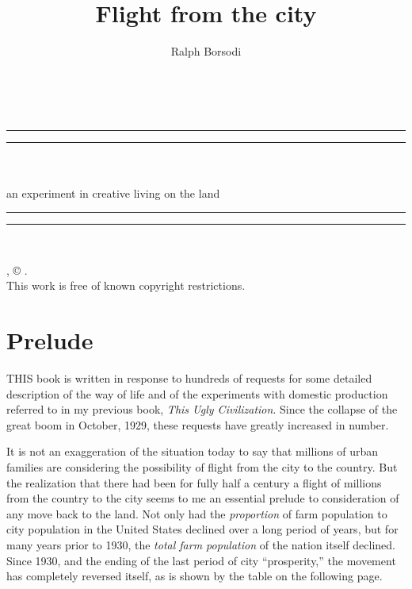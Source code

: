 \documentclass{book}
\date{}
\title{Flight from the city}
\author{Ralph Borsodi}
\begin{document}
\thispagestyle{empty}
\begin{center}
	{\Huge \@title   \\[5mm]}
\end{center}
\newpage
\thispagestyle{empty}
\cleardoublepage
\begin{center}
	\thispagestyle{empty}
	\vspace*{\baselineskip}
	\rule{\textwidth}{1.6pt}\vspace*{-\baselineskip}\vspace*{2pt}
	\rule{\textwidth}{0.4pt}\\[\baselineskip]
	{\Huge\scshape \@title   \\[5mm]}
	{\Large an experiment in creative living on the land}
	\rule{\textwidth}{0.4pt}\vspace*{-\baselineskip}\vspace{3.2pt}
	\rule{\textwidth}{1.6pt}\\[\baselineskip]
	\vspace*{4\baselineskip}
	{\Large \@author}
	\vfill
\end{center}
\pagebreak
\newpage
\thispagestyle{empty}
\null\vfill
\noindent
\begin{center}
	{\emph{\@title}, © \@author.\\[5mm]}
	{This work is free of known copyright restrictions.\\[5mm]}
\end{center}
\pagebreak
\newpage\setcounter{tocdepth}{0}
\setcounter{secnumdepth}{0}

\chapter*{Prelude}
\label{chapter-0}
THIS book is written in response to hundreds of requests for some detailed description of the way of life and of the experiments with domestic production referred to in my previous book, \emph{This Ugly Civilization}. Since the collapse of the great boom in October, 1929, these requests have greatly increased in number.

It is not an exaggeration of the situation today to say that millions of urban families are considering the possibility of flight from the city to the country. But the realization that there had been for fully half a century a flight of millions from the country to the city seems to me an essential prelude to consideration of any move back to the land. Not only had the \emph{proportion} of farm population to city population in the United States declined over a long period of years, but for many years prior to 1930, the \emph{total farm population} of the nation itself declined. Since 1930, and the ending of the last period of city “prosperity,” the movement has completely reversed itself, as is shown by the table on the following page.
\end{document}
